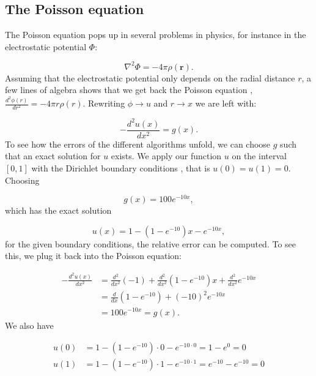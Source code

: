 \documentclass{emulateapj}
\begin{document}
\subsection{The Poisson equation}
The Poisson equation pops up in several problems in physics, for instance in the electrostatic potential \(\Phi\):

\begin{equation*}
    \nabla^2\Phi = -4\pi\rho(\mathbf{r}).
\end{equation*}
Assuming that the electrostatic potential only depends on the radial distance \(r\), a few lines of algebra shows that we get back the Poisson equation \cite[Chapter 13]{matmet}, \(\frac{d^{2}\phi(r)}{dr^{2}}=-4\pi r\rho(r)\). Rewriting \(\phi\rightarrow u\) and \(r\rightarrow x\) we are left with:

\begin{equation}\label{eq:Poisson_equation}
    -\frac{d^{2}u(x)}{dx^{2}} = g(x).
\end{equation}
To see how the errors of the different algorithms unfold, we can choose \(g\) such that an exact solution for \(u\) exists. We apply our function \( u \) on the interval \([0,1]\) with the Dirichlet boundary conditions \cite[Chapter 13]{matmet}, that is \(u(0) = u(1) = 0\). Choosing

\begin{equation*}
    g(x) = 100e^{-10x},
\end{equation*}
which has the exact solution

\begin{equation*}
    u(x) = 1 - \left(1 - e^{-10}\right)x - e^{-10x},
\end{equation*}
for the given boundary conditions, the relative error can be computed. To see this, we plug it back into the Poisson equation:

\begin{align*}
    -\frac{d^{2}u(x)}{dx^{2}} &= 
    \frac{d^{2}}{dx^{2}}(-1) + \frac{d^{2}}{dx^{2}}\left(1 - e^{-10}\right)x + \frac{d^{2}}{dx^{2}}e^{-10x} \\
    &= \frac{d}{dx}\left(1 - e^{-10}\right)+  \left(-10\right)^{2}e^{-10x} \\
    &= 100e^{-10x} = g(x).
\end{align*}
We also have 

\begin{align*}
    u(0) &= 1 - \left(1 - e^{-10}\right)\cdot0 - e^{-10\cdot0} 
    = 1 - e^{0} = 0 \\
    u(1) &= 1 - \left(1 - e^{-10}\right)\cdot1 - e^{-10\cdot1} 
    = e^{-10} - e^{-10} = 0 
\end{align*}
\end{document}

